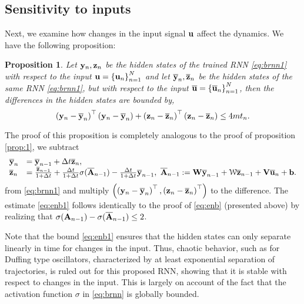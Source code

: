 \documentclass{article} \usepackage{iclr2021_conference,times}
\newtheorem{proposition}[theorem]{Proposition}
\newcommand{\cW}{\EuScript{W}}
\newcommand{\by}{{\bf y}}
\newcommand{\bz}{{\bf z}}
\newcommand{\bW}{{\bf W}}
\newcommand{\bu}{{\bf u}}
\newcommand{\bb}{{\bf b}}
\newcommand{\bV}{{\bf V}}
\newcommand{\bA}{{\bf A}}
\newcommand{\Dt}{{\Delta t}}
\begin{document}
\subsection{Sensitivity to inputs}
\label{app:input_stable}
Next, we examine how changes in the input signal $\bu$ affect the dynamics. We have the following proposition:
\begin{proposition}
\label{prop:2}
Let $\by_n,\bz_n$ be the hidden states of the trained RNN \eqref{eq:brnn1} with respect to the input $\bu = \left\{\bu_n\right\}_{n=1}^N$ and let $\overline{\by}_n,\overline{\bz}_n$ be the hidden states of the same RNN \eqref{eq:brnn1}, but with respect to the input $\overline{\bu} = \left\{\overline{\bu}_n\right\}_{n=1}^N$, then the differences in the hidden states are bounded by,
\begin{equation}
    \label{eq:enb1}
    \left(\by_n-\overline{\by}_n\right)^\top \left(\by_n - \overline{\by}_n \right) + \left(\bz_n-\overline{\bz}_n\right)^\top \left(\bz_n - \overline{\bz}_n \right) \leq 4mt_n.
\end{equation}
\end{proposition}
The proof of this proposition is completely analogous to the proof of proposition \ref{prop:1}, we subtract 
\begin{equation}
\label{eq:brnn2}
\begin{array}{ll}
\overline{\by}_n &= \overline{\by}_{n-1} + \Dt \overline{\bz}_n,  \\
\overline{\bz}_n &= \frac{\overline{\bz}_{n-1}}{1+ \Dt}  + \frac{\Dt}{1 + \Dt}  \sigma(\overline{\bA}_{n-1}) - \frac{\Dt}{1+ \Dt} \overline{\by}_{n-1},~\overline{\bA}_{n-1} :=  \bW\overline{\by}_{n-1} +  {\bf \cW} \overline{\bz}_{n-1} + \bV \overline{\bu}_{n} + \bb.  
\end{array}
\end{equation}
from \eqref{eq:brnn1} and multiply $\left(\left(\by_n-\overline{\by}_n\right)^\top,\left(\bz_n-\overline{\bz}_n\right)^\top \right)$ to the difference. The estimate \eqref{eq:enb1} follows identically to the proof of \eqref{eq:enb} (presented above) by realizing that $\sigma(\bA_{n-1}) - \sigma(\overline{\bA}_{n-1}) \leq 2$.

Note that the bound \eqref{eq:enb1} ensures that the hidden states can only separate linearly in time for changes in the input. Thus, chaotic behavior, such as for Duffing type oscillators, characterized by at least exponential separation of trajectories, is ruled out for this proposed RNN, showing that it is stable with respect to changes in the input. This is largely on account of the fact that the activation function $\sigma$ in \eqref{eq:brnn} is globally bounded. 
\end{document}

